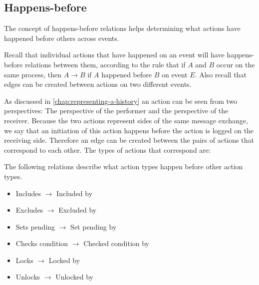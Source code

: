 	\subsection{Happens-before}
	The concept of happens-before relations helps determining what actions have happened before others across events.
	
	Recall that individual actions that have happened on an event will have happens-before relations between them, according to the rule that if $A$ and $B$ occur on the same process, then $A \rightarrow B$ if $A$ happened before $B$ on event $E$.
	Also recall that edges can be created between actions on two different events.
	
	
	\newpar As discussed in \autoref{chap:representing-a-history} an action can be seen from two perspectives: The perspective of the performer and the perspective of the receiver.
	Because the two actions represent sides of the same message exchange, we say that an initiation of this action happens before the action is logged on the receiving side. Therefore an edge can be created between the pairs of actions that correspond to each other. The types of actions that correspond are:
	
	\begin{definition}
		The following relations describe what action types happen before other action types.
			\begin{itemize}
				\item Includes $\rightarrow$ Included by
				\item Excludes $\rightarrow$ Excluded by
				\item Sets pending $\rightarrow$ Set pending by
				\item Checks condition $\rightarrow$ Checked condition by
				\item Locks $\rightarrow$ Locked by
				\item Unlocks $\rightarrow$ Unlocked by
			\end{itemize}
			\label{def:happensbeforeaction}
	\end{definition}
	
